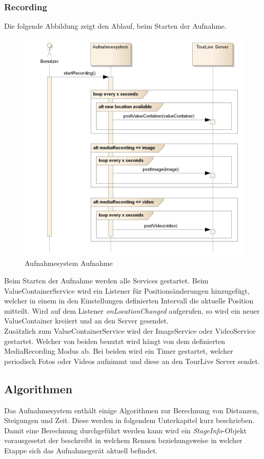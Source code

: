 \subsubsection{Recording}
Die folgende Abbildung zeigt den Ablauf, beim Starten der Aufnahme.
\begin{figure}[H]
	\centering
	\includegraphics[width=150mm]{images/android/recording.jpg}
	\caption{Aufnahmesystem Aufnahme}
\end{figure}

Beim Starten der Aufnahme werden alle Services gestartet. Beim ValueContainerService wird ein Listener für Positionsänderungen hinzugefügt, welcher in einem in den Einstellungen definierten Intervall die aktuelle Position mitteilt. Wird auf dem Listener \textit{onLocationChanged} aufgerufen, so wird ein neuer ValueContainer kreiiert und an den Server gesendet.\\
Zusätzlich zum ValueContainerService wird der ImageService oder VideoService gestartet. Welcher von beiden benutzt wird hängt von dem definierten MediaRecording Modus ab. Bei beiden wird ein Timer gestartet, welcher periodisch Fotos oder Videos aufnimmt und diese an den TourLive Server sendet.

\subsection{Algorithmen}
Das Aufnahmesystem enthält einige Algorithmen zur Berechnung von Distanzen, Steigungen und Zeit. Diese werden in folgendem Unterkapitel kurz beschrieben. Damit eine Berechnung durchgeführt werden kann wird ein \textit{StageInfo}-Objekt vorausgesetzt der beschreibt in welchem Rennen beziehungsweise in welcher Etappe sich das Aufnahmegerät aktuell befindet.
\\

